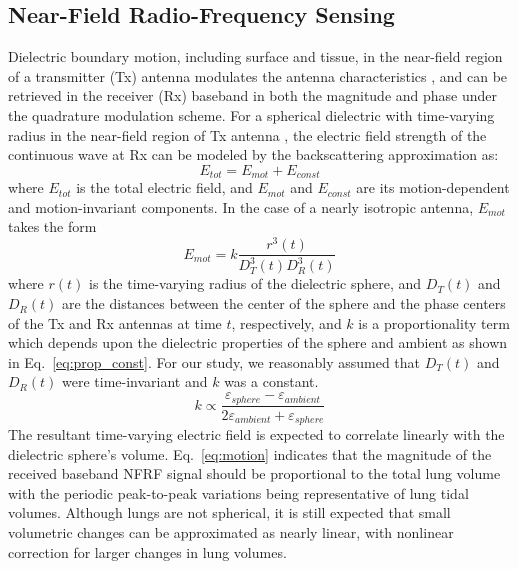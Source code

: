\documentclass[journal,twoside,web]{ieeecolor}
\begin{document}
\subsection{Near-Field Radio-Frequency Sensing}
Dielectric boundary motion, including surface and tissue, in the near-field region of a transmitter (Tx) antenna modulates the antenna characteristics \cite{huiMonitoringVitalSigns2018}, and can be retrieved in the receiver (Rx) baseband in both the magnitude and phase under the quadrature modulation scheme. For a spherical dielectric with time-varying radius in the near-field region of Tx antenna \cite{zhouBackscatterFieldModel2023}, the electric field strength of the continuous wave at Rx can be modeled by the backscattering approximation as:  
\begin{equation}
    E_{tot} = E_{mot} + E_{const}
\end{equation}
where $E_{tot}$ is the total electric field, and $E_{mot}$ and $E_{const}$ are its motion-dependent and motion-invariant components. In the case of a nearly isotropic antenna, $E_{mot}$ takes the form 
\begin{equation}
    E_{mot} = k \frac{r^{3}(t)}{D_{T}^3(t) D_{R}^3(t)} 
    \label{eq:motion}
\end{equation}
where $r(t)$ is the time-varying radius of the dielectric sphere, and $D_T(t)$ and $D_R(t)$ are the distances between the center of the sphere and the phase centers of the Tx and Rx antennas at time $t$, respectively, and $k$ is a proportionality term which depends upon the dielectric properties of the sphere and ambient as shown in Eq.~\ref{eq:prop_const}. For our study, we reasonably assumed that $D_T(t)$ and $D_R(t)$ were time-invariant and $k$ was a constant. 
\begin{equation}
    k \propto \frac{\varepsilon_{sphere} - \varepsilon_{ambient}}{2\varepsilon_{ambient} + \varepsilon_{sphere}}
    \label{eq:prop_const}
\end{equation}
The resultant time-varying electric field is expected to correlate linearly with the dielectric sphere's volume. Eq.~\ref{eq:motion} indicates that the magnitude of the received baseband NFRF signal should be proportional to the total lung volume with the periodic peak-to-peak variations being representative of lung tidal volumes. Although lungs are not spherical, it is still expected that small volumetric changes can be approximated as nearly linear, with nonlinear correction for larger changes in lung volumes. 
\end{document}
